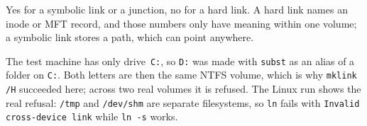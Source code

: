 
Yes for a symbolic link or a junction, no for a hard link. A hard link names an
inode or MFT record, and those numbers only have meaning within one volume; a
symbolic link stores a path, which can point anywhere.

The test machine has only drive~\texttt{C:}, so \texttt{D:} was made with
\texttt{subst} as an alias of a folder on \texttt{C:}. Both letters are then the
same NTFS volume, which is why \texttt{mklink /H} succeeded here; across two
real volumes it is refused. The Linux run shows the real refusal: \texttt{/tmp}
and \texttt{/dev/shm} are separate filesystems, so \texttt{ln} fails with
\texttt{Invalid cross-device link} while \texttt{ln -s} works.

